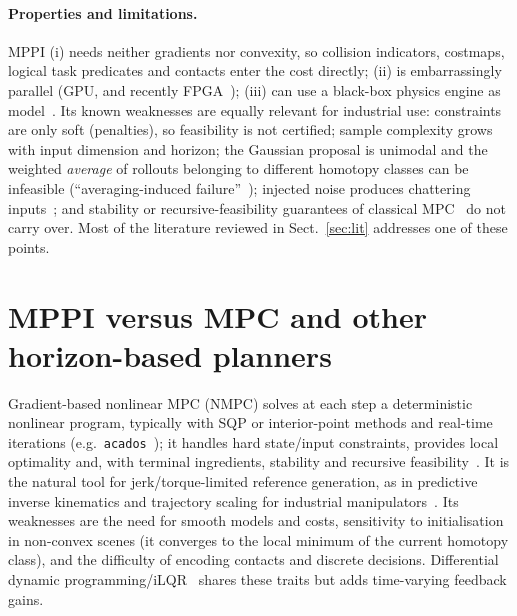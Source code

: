 \paragraph{Properties and limitations.}
MPPI (i) needs neither gradients nor convexity, so collision indicators, costmaps, logical task predicates and contacts enter the cost directly; (ii) is embarrassingly parallel (GPU, and recently FPGA~\cite{desai2026fpgampi}); (iii) can use a black-box physics engine as model~\cite{pezzato2025isaacmppi,howell2022predictivesampling}. Its known weaknesses are equally relevant for industrial use: constraints are only soft (penalties), so feasibility is not certified; sample complexity grows with input dimension and horizon; the Gaussian proposal is unimodal and the weighted \emph{average} of rollouts belonging to different homotopy classes can be infeasible (``averaging-induced failure''~\cite{liu2026clusteringmppi}); injected noise produces chattering inputs~\cite{kim2022smppi}; and stability or recursive-feasibility guarantees of classical MPC~\cite{mayne2014mpc} do not carry over. Most of the literature reviewed in Sect.~\ref{sec:lit} addresses one of these points.

\section{MPPI versus MPC and other horizon-based planners}\label{sec:cmp}
Gradient-based nonlinear MPC (NMPC) solves at each step a deterministic nonlinear program, typically with SQP or interior-point methods and real-time iterations (e.g.\ \texttt{acados}~\cite{verschueren2022acados}); it handles hard state/input constraints, provides local optimality and, with terminal ingredients, stability and recursive feasibility~\cite{rawlings2017mpc,mayne2014mpc}. It is the natural tool for jerk/torque-limited reference generation, as in predictive inverse kinematics and trajectory scaling for industrial manipulators~\cite{faroni2019pik,faroni2020scaling}. Its weaknesses are the need for smooth models and costs, sensitivity to initialisation in non-convex scenes (it converges to the local minimum of the current homotopy class), and the difficulty of encoding contacts and discrete decisions. Differential dynamic programming/iLQR~\cite{tassa2012ilqg} shares these traits but adds time-varying feedback gains.

